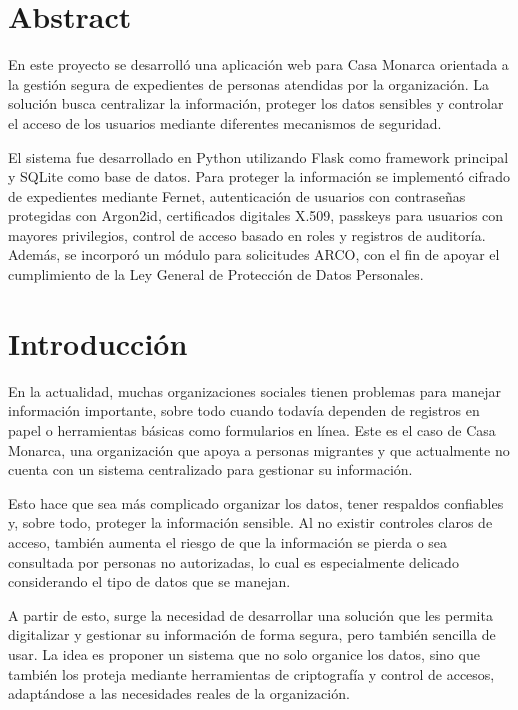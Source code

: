 \documentclass[10pt, letterpaper]{article}
\begin{document}
\newpage
\tableofcontents
\newpage
\listoffigures
\listoftables
\newpage

\pagestyle{reto_cripto}

\section{Abstract}

En este proyecto se desarrolló una aplicación web para Casa Monarca orientada a la gestión segura de expedientes de personas atendidas por la organización. La solución busca centralizar la información, proteger los datos sensibles y controlar el acceso de los usuarios mediante diferentes mecanismos de seguridad.

El sistema fue desarrollado en Python utilizando Flask como framework principal y SQLite como base de datos. Para proteger la información se implementó cifrado de expedientes mediante Fernet, autenticación de usuarios con contraseñas protegidas con Argon2id, certificados digitales X.509, passkeys para usuarios con mayores privilegios, control de acceso basado en roles y registros de auditoría. Además, se incorporó un módulo para solicitudes ARCO, con el fin de apoyar el cumplimiento de la Ley General de Protección de Datos Personales.

\section{Introducción}

En la actualidad, muchas organizaciones sociales tienen problemas para manejar información importante, sobre todo cuando todavía dependen de registros en papel o herramientas básicas como formularios en línea. Este es el caso de Casa Monarca, una organización que apoya a personas migrantes y que actualmente no cuenta con un sistema centralizado para gestionar su información.

Esto hace que sea más complicado organizar los datos, tener respaldos confiables y, sobre todo, proteger la información sensible. Al no existir controles claros de acceso, también aumenta el riesgo de que la información se pierda o sea consultada por personas no autorizadas, lo cual es especialmente delicado considerando el tipo de datos que se manejan.

A partir de esto, surge la necesidad de desarrollar una solución que les permita digitalizar y gestionar su información de forma segura, pero también sencilla de usar. La idea es proponer un sistema que no solo organice los datos, sino que también los proteja mediante herramientas de criptografía y control de accesos, adaptándose a las necesidades reales de la organización.
\end{document}
